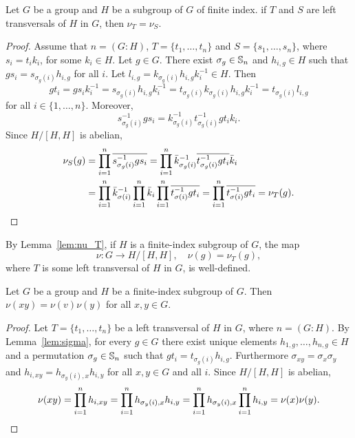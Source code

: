 \begin{lemma}
	\label{lem:nu_T}
	Let $G$ be a group and $H$ be a subgroup of $G$ of finite index. if $T$ 
	and $S$ are left transversals of $H$ in $G$, then $\nu_T=\nu_S$.
\end{lemma}

\begin{proof}
	Assume that $n=(G:H)$, $T=\{ t_1,\dots ,t_n\}$ and $S=\{ s_1,\dots ,s_n\}$, where $s_i=t_ik_i$, for some $k_i\in H$. Let $g\in G$. There exist $\sigma_{g}\in \mathbb{S}_n$ and $h_{i,g}\in H$ such that $gs_i=s_{\sigma_g(i)}h_{i,g}$ for all $i$. Let $l_{i,g}=k_{\sigma_g(i)}h_{i,g}k_i^{-1}\in H$. Then 
	\[
	gt_i=gs_ik_i^{-1}=s_{\sigma_g(i)}h_{i,g}k_i^{-1}=t_{\sigma_g(i)}k_{\sigma_g(i)}h_{i,g}k_i^{-1}=t_{\sigma_g(i)}l_{i,g}
	\]
	for all $i\in\{1,\dots,n\}$. Moreover,  
	\[
			s_{\sigma_g(i)}^{-1}gs_i=k_{\sigma_g(i)}^{-1}t_{\sigma_g(i)}^{-1}gt_ik_i.
	\]
	Since $H/[H,H]$ is abelian, 
	\begin{align*}
		\nu_S(g)
		&=\prod_{i=1}^n \overline{s_{\sigma_g(i)}^{-1}gs_i}
		=\prod_{i=1}^n \bar k_{\sigma_g(i)}^{-1}\overline{t_{\sigma_g(i)}^{-1}gt_i}\bar k_i\\
		&=\prod_{i=1}^n \bar k_{\sigma(i)}^{-1}\prod_{i=1}^n \bar k_i\prod_{i=1}^n \overline{t_{\sigma(i)}^{-1}gt_i}
		=\prod_{i=1}^n \overline{t_{\sigma(i)}^{-1}gt_i}
		=\nu_T(g).\qedhere
	\end{align*}
\end{proof}

By Lemma~\ref{lem:nu_T}, if $H$ is a finite-index subgroup of $G$, the map 
\[
\nu\colon G\to H/[H,H],
\quad
\nu(g)=\nu_T(g),
\]
where $T$ is some left transversal of $H$ in $G$, is well-defined. 

\begin{theorem}
	\label{theorem:transfer}
	Let $G$ be a group and $H$ be a finite-index subgroup of $G$. Then $\nu(xy)=\nu(v)\nu(y)$ 
	for all $x,y\in G$.
\end{theorem}

\begin{proof}
	Let $T=\{t_1,\dots,t_n\}$ be a left transversal of $H$ in $G$, where $n=(G:H)$.  By 
	Lemma~\ref{lem:sigma}, for every $g\in G$ there exist unique elements $h_{1,g},\dots,h_{n,g}\in H$ and 
	a permutation $\sigma_g\in\mathbb{S}_n$ such that $gt_i=t_{\sigma_g(i)}h_{i,g}$. Furthermore $\sigma_{xy}=\sigma_x\sigma_y$ and $h_{i,xy}=h_{\sigma_y(i),x}h_{i,y}$ for all $x,y\in G$ and all $i$. Since $H/[H,H]$ is abelian, 
	\[
		\nu(xy)=\prod_{i=1}^nh_{i,xy}=\prod_{i=1}^n h_{\sigma_y(i),x}h_{i,y}=\prod_{i=1}^n h_{\sigma_y(i),x}\prod_{i=1}^n h_{i,y}=\nu(x)\nu(y).\qedhere
	\]
\end{proof}

